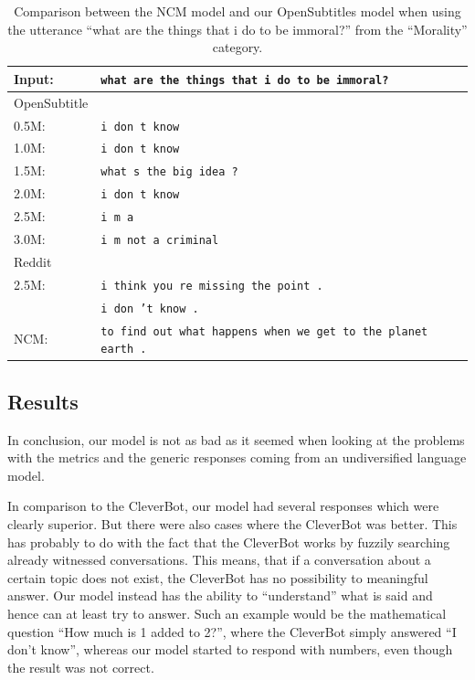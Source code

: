 \begin{table}[H]
	\centering
	\begin{adjustbox}{max width=\textwidth}
		\begin{tabular}{ll}
			\toprule
			Input: 	& \texttt{what are the things that i do to be immoral?}\\
			\midrule
			OpenSubtitle\\
			0.5M: 	& \texttt{i don t know}\\
			1.0M: 	& \texttt{i don t know}\\
			1.5M:	& \texttt{what s the big idea ?}\\
			2.0M:	& \texttt{i don t know}\\
			2.5M:	& \texttt{i m a}\\
			3.0M:	& \texttt{i m not a criminal}\\
			\midrule
			Reddit\\
			2.5M:	& \texttt{i think you re missing the point .}\\
			& \texttt{i don ’t know .}\\
			\midrule
			NCM:	& \texttt{to find out what happens when we get to the planet earth .}\\
			\bottomrule
		\end{tabular}
	\end{adjustbox}
	\caption{Comparison between the NCM model and our OpenSubtitles model when using the utterance ``what are the things that i do to be immoral?'' from the ``Morality'' category.}
	\label{results:example14_output:Neural_Conversational_Model_compared}
\end{table}

\subsection{Results}
In conclusion, our model is not as bad as it seemed when looking at the problems with the metrics and the generic responses coming from an undiversified language model.

In comparison to the CleverBot, our model had several responses which were clearly superior. But there were also cases where the CleverBot was better. This has probably to do with the fact that the CleverBot works by fuzzily searching already witnessed conversations. This means, that if a conversation about a certain topic does not exist, the CleverBot has no possibility to meaningful answer. Our model instead has the ability to ``understand'' what is said and hence can at least try to answer. Such an example would be the mathematical question ``How much is 1 added to 2?'', where the CleverBot simply answered ``I don't know'', whereas our model started to respond with numbers, even though the result was not correct.

